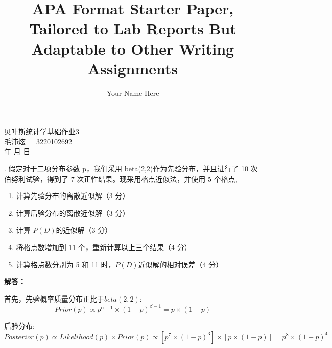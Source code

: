 \documentclass[stu,12pt,floatsintext]{apa7} %
\title{APA Format Starter Paper, Tailored to Lab Reports But Adaptable to Other Writing Assignments} %
\author{Your Name Here}
\affiliation{Your School}
\begin{document}
\begin{titlepage}
    \centering
    \vspace*{4cm} %
    \Huge
    {\heiti 贝叶斯统计学基础作业3} \\
    \vspace{1cm}
    \Large
    毛沛炫\ \ \ 3220102692 \\
    \vspace{12.3cm}
    \Large
    \number\year 年 \number\month 月 \number\day 日
    \vfill
\end{titlepage}




. {\heiti 假定对于二项分布参数 p，我们采用 beta(2,2)作为先验分布，并且进行了 10 次伯努利试验，得到了 7 次正性结果。现采用格点近似法，并使用 5 个格点,}
\begin{enumerate}[itemsep=2pt,topsep=0pt,parsep=0pt,label=(\alph*)]
    \item 计算先验分布的离散近似解（3 分）
    \item 计算后验分布的离散近似解（3 分）
    \item 计算 \(P(D)\)的近似解（3 分）
    \item 将格点数增加到 11 个，重新计算以上三个结果（4 分）
    \item 计算格点数分别为 5 和 11 时，\(P(D)\)近似解的相对误差（4 分）
\end{enumerate}


\noindent \textbf{解答：}

首先，先验概率质量分布正比于\(beta(2,2)\): 
\[
    Prior(p) \propto p^{\alpha-1}\times(1-p)^{\beta-1}  = p\times(1-p)
\]

后验分布: 
\[
    Posterior(p) \propto Likelihood(p)\times Prior(p) \propto [p^7\times(1-p)^3]\times[p\times(1-p)] = p^8\times(1-p)^4
\]
\end{document}

